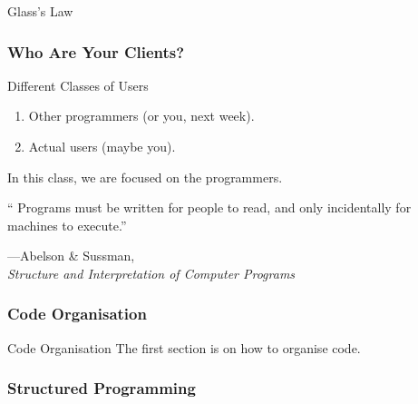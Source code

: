 \begin{frame}[fragile]
Glass's Law 
\end{frame}

\begin{frame}[fragile]
\frametitle{Who Are Your Clients?}
\begin{block}{Different Classes of Users}
\begin{enumerate}
\item Other programmers (or you, next week).
\item Actual users (maybe you).
\end{enumerate}
\end{block}

In this class, we are focused on the programmers.
\end{frame}

\begin{frame}[fragile]

`` Programs must be written for people to read, and only incidentally for machines to execute.''
\begin{flushright}
---Abelson \& Sussman, \\\textit{Structure and Interpretation of Computer Programs}
\end{flushright}

\end{frame}



\begin{frame}[fragile]
\frametitle{Code Organisation}

\begin{block}{Code Organisation}
The first section is on how to organise code.
\end{block}
\end{frame}

\begin{frame}[fragile]
\frametitle{Structured Programming}
\end{frame}


